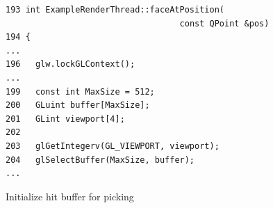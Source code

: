 \documentclass[jou,noapacite]{apa}
\begin{document}
\begin{figure}[h]
\begin{lstlisting}[basicstyle=\scriptsize]
193 int ExampleRenderThread::faceAtPosition(
                                   const QPoint &pos)
194 {
...
196   glw.lockGLContext();
...
199   const int MaxSize = 512;
200   GLuint buffer[MaxSize];
201   GLint viewport[4];
202
203   glGetIntegerv(GL_VIEWPORT, viewport);
204   glSelectBuffer(MaxSize, buffer);
...
\end{lstlisting}
\caption{Initialize hit buffer for picking}
\label{lst:hitbuf}
\end{figure}
\end{document}
